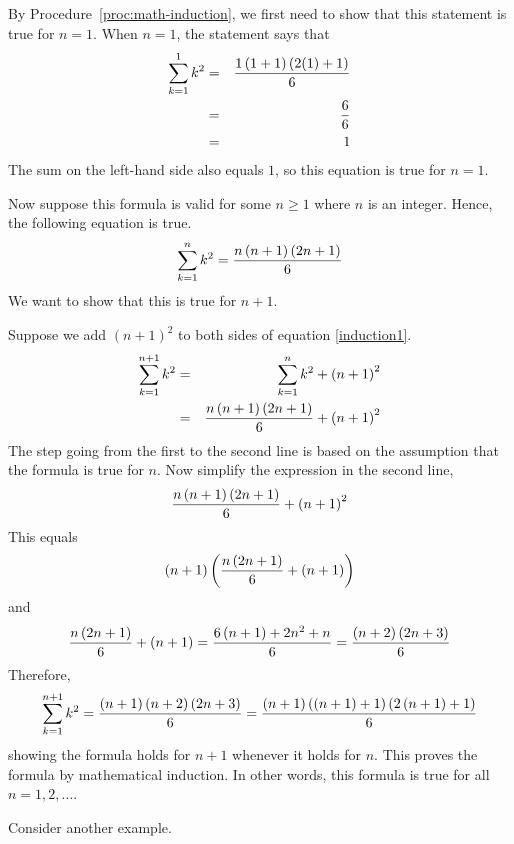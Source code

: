 \begin{solution}
By Procedure~\ref{proc:math-induction}, we first need to show that this statement is true for $n=1$.
When $n=1$, the statement says that 
\begin{eqnarray*}
\sum_{k=1}^{1}k^{2}&=&\frac{1\left(1+1\right) \left(2(1)+1\right) }{6}\\
&=&\frac{6}{6} \\
&=& 1
\end{eqnarray*}
The sum on the left-hand side also equals $1$, so this equation is true for $n=1$.

Now suppose this formula is valid for some $n\geq
1$ where $n$ is an integer. Hence, the following equation is true.
\begin{equation}
\sum_{k=1}^{n}k^{2}=
\frac{n\left(n+1\right) \left(2n+1\right) }{6}
\label{induction1}
\end{equation}
We want to show that this is true for $n+1$. 

Suppose we add $(n+1)^2$ to both sides of equation {\eqref{induction1}}.
\begin{eqnarray*}
\sum_{k=1}^{n+1}k^{2}&=&\sum_{k=1}^{n}k^{2}+\left(n+1\right) ^{2} \\
&=&\frac{n\left(n+1\right) \left(2n+1\right) }{6}+\left(n+1\right) ^{2}
\end{eqnarray*}
The step going from the first to the second line is based on the assumption
that the formula is true for $n$.
Now simplify the expression in the second line,
\begin{equation*}
\frac{n\left(n+1\right) \left(2n+1\right) }{6}+\left(n+1\right) ^{2}
\end{equation*}
This equals
\begin{equation*}
\left(n+1\right) \left(\frac{n\left(2n+1\right) }{6}+\left(n+1\right)
\right)
\end{equation*}
and
\begin{equation*}
\frac{n\left(2n+1\right) }{6}+\left(n+1\right) =\frac{6\left(n+1\right)
+2n^{2}+n}{6}=\frac{\allowbreak \left(n+2\right) \left(2n+3\right) }{6}
\end{equation*}
Therefore,
\begin{equation*}
\sum_{k=1}^{n+1}k^{2}=\frac{\allowbreak \left(n+1\right) \left(n+2\right)
\left(2n+3\right) }{6}=\frac{\allowbreak \left(n+1\right) \left(\left(
n+1\right) +1\right) \left(2\left(n+1\right) +1\right) }{6}
\end{equation*}
showing the formula holds for $n+1$ whenever it holds for $n$. This proves
the formula by mathematical induction. In other words, this formula is true for all $n = 1, 2, \ldots$.
\end{solution}

Consider another example.

